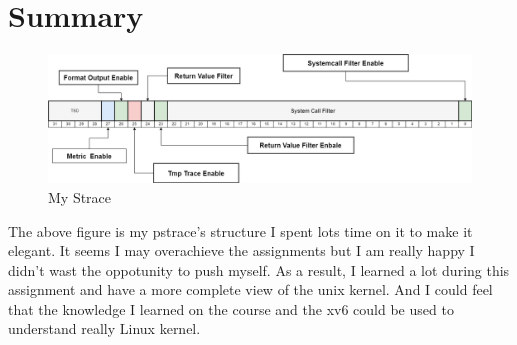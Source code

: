 \documentclass[11pt,oneside,a4paper]{article}
\begin{document}
\section{Summary}

\begin{figure}[H]
    \includegraphics[width=4.75in]{pstrace.png}
    \centering
    \caption{My Strace}
\end{figure}

The above figure is my pstrace's structure I spent lots time on it to make it elegant.
It seems I may overachieve the assignments but I am really happy I didn't wast the oppotunity
to push myself. As a result, I learned a lot during this assignment and have a more 
complete view of the unix kernel. And I could feel that the knowledge I learned on 
the course and the xv6 could be used to understand really Linux kernel. 
\end{document}

